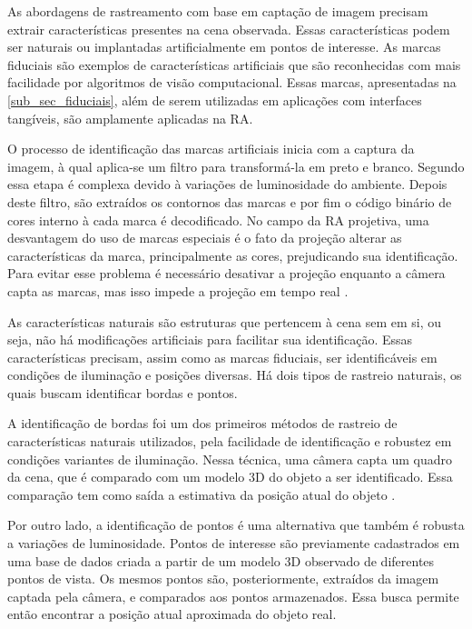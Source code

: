 
As abordagens de rastreamento com base em captação de imagem precisam extrair características presentes na cena observada. Essas características podem ser naturais ou implantadas artificialmente em pontos de interesse. As marcas fiduciais são exemplos de características artificiais que são reconhecidas com mais facilidade por algoritmos de visão computacional. Essas marcas, apresentadas na \autoref{sub_sec_fiduciais}, além de serem utilizadas em aplicações com interfaces tangíveis, são amplamente aplicadas na RA.

O processo de identificação das marcas artificiais inicia com a captura da imagem, à qual aplica-se um filtro para transformá-la em preto e branco. Segundo  essa etapa é complexa devido à variações de luminosidade do ambiente. Depois deste filtro, são extraídos os contornos das marcas e por fim o código binário de cores interno à cada marca é decodificado.
No campo da RA projetiva, uma desvantagem do uso de marcas especiais é o fato da projeção alterar as características da marca, principalmente as cores, prejudicando sua identificação. Para evitar esse problema é necessário desativar a projeção enquanto a câmera capta as marcas, mas isso impede a projeção em tempo real \cite{resch_enhancing_2016}.

As características naturais são estruturas que pertencem à cena sem em si, ou seja, não há modificações artificiais para facilitar sua identificação. Essas características precisam, assim como as marcas fiduciais, ser identificáveis em condições de iluminação e posições diversas. Há dois tipos de rastreio naturais, os quais buscam identificar bordas e pontos.

A identificação de bordas foi um dos primeiros métodos de rastreio de características naturais utilizados, pela facilidade de identificação e robustez em condições variantes de iluminação. Nessa técnica, uma câmera capta um quadro da cena, que é comparado com um modelo 3D do objeto a ser identificado. Essa comparação tem como saída a estimativa da posição atual do objeto \cite{resch_enhancing_2016}.

Por outro lado, a identificação de pontos é uma alternativa que também é robusta a variações de luminosidade. Pontos de interesse são previamente cadastrados em uma base de dados criada a partir de um modelo 3D observado de diferentes pontos de vista. Os mesmos pontos são, posteriormente, extraídos da imagem captada pela câmera, e comparados aos pontos armazenados. Essa busca permite então encontrar a posição atual aproximada do objeto real.

